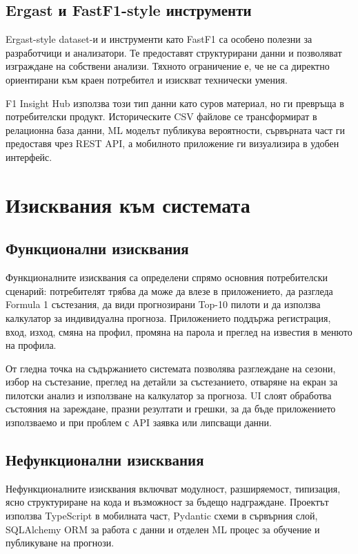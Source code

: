 \documentclass[12pt,a4paper]{article}
\begin{document}
\subsection{Ergast и FastF1-style инструменти}

Ergast-style dataset-и и инструменти като FastF1 са особено полезни за разработчици и анализатори. Те предоставят структурирани данни и позволяват изграждане на собствени анализи. Тяхното ограничение е, че не са директно ориентирани към краен потребител и изискват технически умения.

F1 Insight Hub използва този тип данни като суров материал, но ги превръща в потребителски продукт. Историческите CSV файлове се трансформират в релационна база данни, ML моделът публикува вероятности, сървърната част ги предоставя чрез REST API, а мобилното приложение ги визуализира в удобен интерфейс.

\section{Изисквания към системата}

\subsection{Функционални изисквания}

Функционалните изисквания са определени спрямо основния потребителски сценарий: потребителят трябва да може да влезе в приложението, да разгледа Formula 1 състезания, да види прогнозирани Top-10 пилоти и да използва калкулатор за индивидуална прогноза. Приложението поддържа регистрация, вход, изход, смяна на профил, промяна на парола и преглед на известия в менюто на профила.

От гледна точка на съдържанието системата позволява разглеждане на сезони, избор на състезание, преглед на детайли за състезанието, отваряне на екран за пилотски анализ и използване на калкулатор за прогноза. UI слоят обработва състояния на зареждане, празни резултати и грешки, за да бъде приложението използваемо и при проблем с API заявка или липсващи данни.

\subsection{Нефункционални изисквания}

Нефункционалните изисквания включват модулност, разширяемост, типизация, ясно структуриране на кода и възможност за бъдещо надграждане. Проектът използва TypeScript в мобилната част, Pydantic схеми в сървърния слой, SQLAlchemy ORM за работа с данни и отделен ML процес за обучение и публикуване на прогнози.
\end{document}
